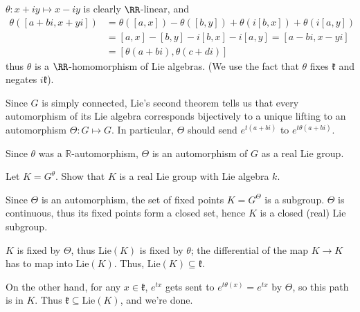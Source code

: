 \documentclass[11pt, headheight=30pt]{scrartcl}
\begin{document}
$\theta: x+iy \mapsto x-iy$ is clearly $\RR$-linear, and
\begin{align*}
    \theta ([a+bi,x+yi] )&= \theta([a,x]) -\theta([b,y]) + \theta(i[b,x]) +  \theta (i[a,y])\\
    &=[a,x]-[b,y]-i[b,x]-i[a,y]=[a-bi,x-yi]\\
    &= [\theta(a+bi),\theta(c+di)]
\end{align*}
thus $\theta$ is a $\RR$-homomorphism of Lie algebras.
(We use the fact that $\theta$ fixes $\mathfrak{k}$ and negates $i\mathfrak{k}$).

Since $G$ is simply connected, Lie's second theorem tells us that every
automorphism of its Lie algebra corresponds bijectively to a unique
lifting to an automorphism $\Theta: G \mapsto G$. In particular, $\Theta$
should send $e^{t(a+bi)}$ to $e^{t\theta(a+bi)}$.

Since $\theta$ was a $\mathbb R$-automorphism,
$\Theta$ is an automorphism of $G$ as a real Lie group.
    
\begin{prob}
    Let $K = G^\theta$. Show that $K$ is a real Lie group with Lie algebra $k$.
\end{prob}

Since $\Theta$ is an automorphism, the set of fixed points
$K=G^\Theta$ is a subgroup. $\Theta$ is continuous, thus
its fixed points form a closed set, hence $K$ is a closed (real) Lie subgroup.

$K$ is fixed by $\Theta$, thus $\mathrm{Lie}(K)$ is fixed by
$\theta$; the differential of the map $K\to K$ has to map into $\mathrm{Lie}(K)$.
Thus, $\mathrm{Lie}(K) \subseteq \mathfrak{k}$.

On the other hand, for any $x \in \mathfrak{k}$,
$e^{tx}$ gets sent to $e^{t\theta(x)} = e^{tx}$
by $\Theta$, so this path is in $K$.
Thus $\mathfrak{k} \subseteq \mathrm{Lie}(K)$, and we're done.

\end{document}
